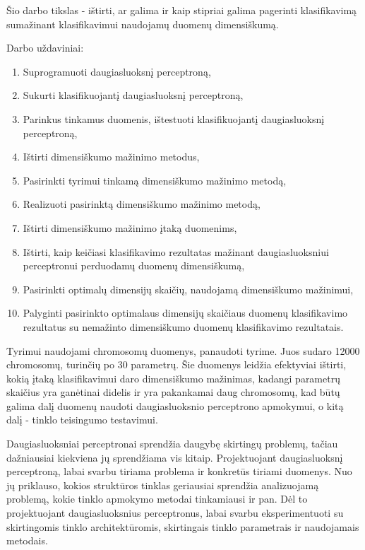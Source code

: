 \documentclass{VUMIFPSbakalaurinis}
\begin{document}
Šio darbo tikslas - ištirti, ar galima ir kaip stipriai galima pagerinti klasifikavimą sumažinant klasifikavimui naudojamų duomenų dimensiškumą.

Darbo uždaviniai:
\begin{enumerate}
	\item Suprogramuoti daugiasluoksnį perceptroną,
	\item Sukurti klasifikuojantį daugiasluoksnį perceptroną,
	\item Parinkus tinkamus duomenis, ištestuoti klasifikuojantį daugiasluoksnį perceptroną,

	\item Ištirti dimensiškumo mažinimo metodus,
	\item Pasirinkti tyrimui tinkamą dimensiškumo mažinimo metodą,
	\item Realizuoti pasirinktą dimensiškumo mažinimo metodą,
	\item Ištirti dimensiškumo mažinimo įtaką duomenims,
	
	\item Ištirti, kaip keičiasi klasifikavimo rezultatas mažinant daugiasluoksniui perceptronui perduodamų duomenų dimensiškumą,
	\item Pasirinkti optimalų dimensijų skaičių, naudojamą dimensiškumo mažinimui,
	\item Palyginti pasirinkto optimalaus dimensijų skaičiaus duomenų klasifikavimo rezultatus su nemažinto dimensiškumo duomenų klasifikavimo rezultatais.
\end{enumerate}

Tyrimui naudojami chromosomų duomenys, panaudoti \cite[289~psl.]{price-dimensionality-reduction} tyrime.
Juos sudaro 12000 chromosomų, turinčių po 30 parametrų.
Šie duomenys leidžia efektyviai ištirti, kokią įtaką klasifikavimui daro dimensiškumo mažinimas, kadangi parametrų skaičius yra ganėtinai didelis ir yra pakankamai daug chromosomų, kad būtų galima dalį duomenų naudoti daugiasluoksnio perceptrono apmokymui, o kitą dalį - tinklo teisingumo testavimui.

Daugiasluoksniai perceptronai sprendžia daugybę skirtingų problemų, tačiau dažniausiai kiekviena jų sprendžiama vis kitaip.
Projektuojant daugiasluoksnį perceptroną, labai svarbu tiriama problema ir konkretūs tiriami duomenys.
Nuo jų priklauso, kokios struktūros tinklas geriausiai sprendžia analizuojamą problemą, kokie tinklo apmokymo metodai tinkamiausi ir pan.
Dėl to projektuojant daugiasluoksnius perceptronus, labai svarbu eksperimentuoti su skirtingomis tinklo architektūromis, skirtingais tinklo parametrais ir naudojamais metodais.
\end{document}
